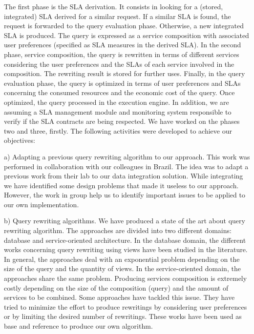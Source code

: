 \documentclass[11pt,a4paper,oneside]{report}
\begin{document}
The first phase is the SLA derivation. It consists in looking for a (stored, integrated) SLA derived for a similar request. If a similar SLA is found, the request is forwarded to the query evaluation phase. Otherwise, a new integrated SLA is produced. The query is expressed as a service composition with associated user preferences (specified as SLA measures in the derived SLA). In the second phase, service composition, the query is rewritten in terms of different services considering the user preferences and the SLAs of each service involved in the composition. The rewriting result is stored for further uses. Finally, in the query evaluation phase, the query is optimized in terms of user preferences and SLAs concerning the consumed resources and the economic cost of the query. Once optimized, the query processed in the execution engine. In addition, we are assuming a SLA management module and monitoring system responsible to verify if the SLA contracts are being respected. 
	We have worked on the phases two and three, firstly. The following activities were developed to achieve our objectives:
	
a) Adapting a previous query rewriting algorithm to our approach. This work was performed in collaboration with our colleagues in Brazil. The idea was to adapt a previous work from their lab to our data integration solution. While integrating we have identified some design problems that made it useless to our approach. However, the work in group help us to identify important issues to be applied to our own implementation.

b) Query rewriting algorithms. We have produced a state of the art about query rewriting algorithm.  The approaches are divided into two different domains: database and service-oriented architecture. In the database domain, the different works concerning query rewriting using views have been studied in the literature. In general, the approaches deal with an exponential problem depending on the size of the query and the quantity of views. In the service-oriented domain, the approaches share the same problem. Producing services composition is extremely costly depending on the size of the composition (query) and the amount of services to be combined. Some approaches have tackled this issue. They have tried to minimize the effort to produce rewritings by considering user preferences or by limiting the desired number of rewritings. These works have been used as base and reference to produce our own algorithm.
\end{document}
